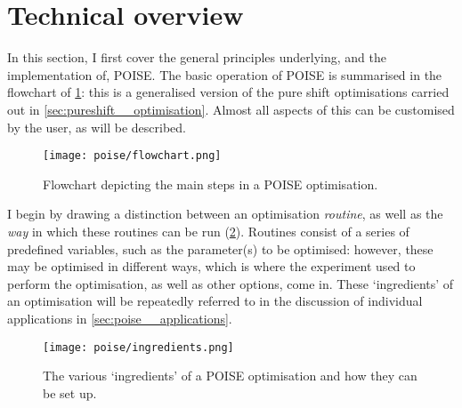 \section{Technical overview}
\label{sec:poise__technical}

In this section, I first cover the general principles underlying, and the implementation of, POISE.
The basic operation of POISE is summarised in the flowchart of \cref{fig:poise_flowchart}: this is a generalised version of the pure shift optimisations carried out in \cref{sec:pureshift__optimisation}.
Almost all aspects of this can be customised by the user, as will be described.

\begin{figure}[!ht]
    \centering
    \texttt{[image: poise/flowchart.png]}%
    \caption[Flowchart for POISE optimisations]{Flowchart depicting the main steps in a POISE optimisation.}
    \label{fig:poise_flowchart}
\end{figure}

I begin by drawing a distinction between an optimisation \textit{routine}, as well as the \textit{way} in which these routines can be run (\cref{fig:poise_ingredients}).
Routines consist of a series of predefined variables, such as the parameter(s) to be optimised: however, these may be optimised in different ways, which is where the experiment used to perform the optimisation, as well as other options, come in.
These `ingredients' of an optimisation will be repeatedly referred to in the discussion of individual applications in \cref{sec:poise__applications}.

\begin{figure}[!ht]
    \centering
    \texttt{[image: poise/ingredients.png]}%
    \caption[Ingredients of a POISE optimisation]{
        The various `ingredients' of a POISE optimisation and how they can be set up.
    }
    \label{fig:poise_ingredients}
\end{figure}






